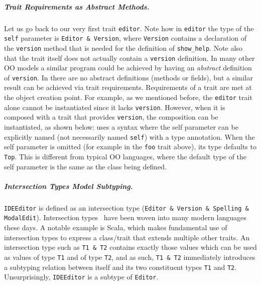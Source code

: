 \subparagraph{Trait Requirements as Abstract Methods.}
Let us go back to our very first trait \lstinline{editor}. Note how in
\lstinline{editor} the type of the \lstinline{self} parameter is
\lstinline{Editor & Version}, where \lstinline{Version} contains a declaration of the
\lstinline{version} method that is needed for the definition of
\lstinline{show_help}. Note also that the trait itself does not actually contain
a \lstinline{version} definition. In many other OO models a similar program
could be achieved by having an \emph{abstract} definition of
\lstinline{version}. In \name there are no abstract definitions (methods or
fields), but a similar result can be achieved via trait requirements.
Requirements of a trait are met at the object creation point. For example, as we
mentioned before, the \lstinline{editor} trait alone cannot be instantiated
since it lacks \lstinline{version}. However, when it is composed with a trait that
provides \lstinline{version}, the composition can be instantiated, as shown below:
\name uses a syntax where the self parameter
can be explicitly named (not necessarily named \lstinline{self}) with a
type annotation. When the self parameter is omitted (for example in the
\lstinline{foo} trait above), its type defaults to \lstinline{Top}. This
is different from typical OO languages, where the default type of the self
parameter is the same as the class being defined.



\subparagraph{Intersection Types Model Subtyping.}
\lstinline{IDEEditor} is defined as an intersection type (\lstinline{Editor & Version & Spelling & ModalEdit}).
Intersection types~\cite{coppo1981functional,pottinger1980type} have been woven
into many modern languages these days. A notable example is Scala, which makes
fundamental use of intersection types to express a class/trait that extends
multiple other traits. An intersection type such as \lstinline{T1 & T2} contains
exactly those values which can be used as values of type \lstinline{T1} and of
type \lstinline{T2}, and as such, \lstinline{T1 & T2} immediately introduces a
subtyping relation between itself and its two constituent types \lstinline{T1}
and \lstinline{T2}. Unsurprisingly, \lstinline{IDEEditor} is a subtype of
\lstinline{Editor}.





